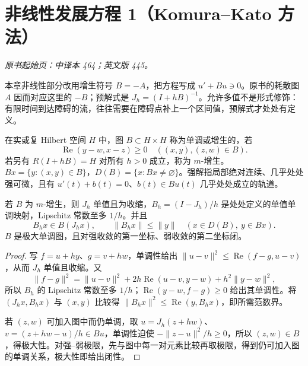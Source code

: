 \section{非线性发展方程 1（Komura--Kato 方法）}\label{sec:yosida-14-06}
\noindent\textit{原书起始页：中译本 464；英文版 445。}

本章非线性部分改用增生符号 $B=-A$，把方程写成 $u'+Bu\ni0$。原书的耗散图 $A$ 因而对应这里的 $-B$；预解式是 $J_h=(I+hB)^{-1}$。允许多值不是形式修饰：有限时间到达障碍的流，往往需要在障碍点补上一个区间值，预解式才处处有定义。

\begin{definition}[增生图与满值域条件]
在实或复 Hilbert 空间 $H$ 中，图 $B\subset H\times H$ 称为单调或增生的，若
\[
 \operatorname{Re}(y-w,x-z)\ge0\quad((x,y),(z,w)\in B).
\]
若另有 $R(I+hB)=H$ 对所有 $h>0$ 成立，称为 $m$-增生。$Bx=\{y:(x,y)\in B\}$，$D(B)=\{x:Bx\ne\varnothing\}$。强解指局部绝对连续、几乎处处强可微，且有 $u'(t)+b(t)=0$、$b(t)\in Bu(t)$ 几乎处处成立的轨道。
\end{definition}

\begin{lemma}\label{lem:y14-yosida}
若 $B$ 为 $m$-增生，则 $J_h$ 单值且为收缩，$B_h=(I-J_h)/h$ 是处处定义的单值单调映射，Lipschitz 常数至多 $1/h$。并且
\[
 B_hx\in B(J_hx),\qquad
 \|B_hx\|\le\|y\|\quad(x\in D(B),\ y\in Bx).
\]
$B$ 是极大单调图，且对强收敛的第一坐标、弱收敛的第二坐标闭。
\end{lemma}
\begin{proof}
写 $f=u+hy$、$g=v+hw$，单调性给出 $\|u-v\|^2\le\operatorname{Re}(f-g,u-v)$，从而 $J_h$ 单值且收缩。又
\[
 \|f-g\|^2=\|u-v\|^2+2h\operatorname{Re}(u-v,y-w)+h^2\|y-w\|^2,
\]
所以 $B_h$ 的 Lipschitz 常数至多 $1/h$；$\operatorname{Re}(y-w,f-g)\ge0$ 给出其单调性。将 $(J_hx,B_hx)$ 与 $(x,y)$ 比较得 $\|B_hx\|^2\le\operatorname{Re}(y,B_hx)$，即所需范数界。

若 $(z,w)$ 可加入图中而仍单调，取 $u=J_h(z+hw)$、$v=(z+hw-u)/h\in Bu$，单调性迫使 $-\|z-u\|^2/h\ge0$，所以 $(z,w)\in B$，得极大性。对强--弱极限，先与图中每一对元素比较再取极限，得到仍可加入图的单调关系，极大性即给出闭性。
\end{proof}

